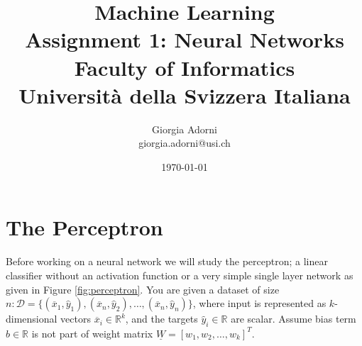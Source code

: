 \documentclass[12pt]{article}
\title{Machine Learning \\ \Large{Assignment 1: Neural Networks} \\[0.3em] \normalsize{Faculty of Informatics} \\ \normalsize{Università della Svizzera Italiana}}
\author {{Giorgia Adorni}	\\ \normalsize{giorgia.adorni@usi.ch}}
\date{\today}
\begin{document}
 


\maketitle 

\section{The Perceptron}

Before working on a neural network we will study the perceptron; a linear classifier
without an activation function or a very simple single layer network as given in Figure \ref{fig:perceptron}.
You are given a dataset of size $n: \mathcal{D} = \{(\overline{x}_1 ,\hat{y}_1),(\overline{x}_n ,\hat{y}_2),\dots , (\overline{x}_n ,\hat{y}_n)\}$, where input is represented as $k$-dimensional vectors $\overline{x}_i \in \mathbb{R}^k$, and the targets $\hat{y}_i \in \mathbb{R}$ are scalar. Assume bias term $b \in \mathbb{R}$ is not part of weight matrix $\underline{W} = [w_1,w_2,\dots,w_k]^T$.
\end{document}
